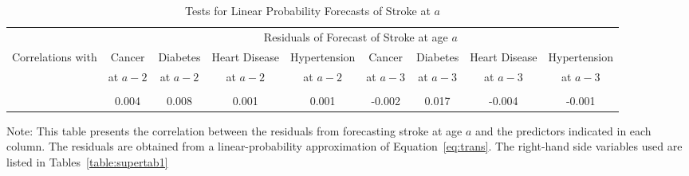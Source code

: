 \begin{landscape}
\begin{table}[H]
\begin{threeparttable}
\caption{Tests for Linear Probability Forecasts of Stroke at $a$} \label{table:1storderresidstroke}
\centering
\footnotesize
\begin{tabular}{l *{8}{c}}
\toprule
& \multicolumn{8}{c}{Residuals of Forecast of Stroke at age $a$} \\
Correlations with	&	 Cancer &	Diabetes & Heart Disease &	Hypertension &	Cancer	& Diabetes & Heart Disease & Hypertension  \\
                    &	at $a-2$	&	at $a - 2$ & at $a - 2$	& at $a - 2$	& at $a-3$	& at $a - 3$	& at $a - 3$	& at $a - 3$ \\
\midrule \\
&	0.004 &	0.008	&	0.001	&	0.001	&	-0.002	&	0.017 &	-0.004 &	-0.001	\\
\bottomrule
\end{tabular}
\begin{tablenotes}
\footnotesize
\item Note: This table presents the correlation between the residuals from forecasting stroke at age $a$ and the predictors indicated in each column. The residuals are obtained from a linear-probability approximation of Equation~\eqref{eq:trans}. The right-hand side variables used are listed in Tables~\ref{table:supertab1} 
\end{tablenotes}
\end{threeparttable}
\end{table}
\end{landscape}
